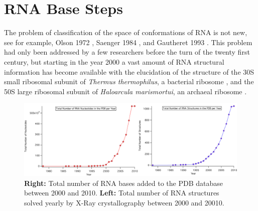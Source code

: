 \chapter{RNA Base Steps}
\label{basesteps} 

The problem of classification of the space of conformations
of RNA  is not  new, see for  example, Olson  1972 \cite{olson1_1972},
Saenger     1984     \cite{saenger1984},     and    Gautheret     1993
\cite{gautheret1993}.  This  problem had only been addressed  by a few
researchers before the turn of  the twenty first century, but starting
in  the year  2000 a  vast amount  of RNA  structural  information has
become  available with  the elucidation  of the  structure of  the 30S
small ribosomal subunit  of \textit{Thermus thermophilus}, a bacterial
ribosome \cite{wimberly2000, schluenzen2000}, and the 50S large
ribosomal subunit of \textit{Haloarcula marismortui}, an archaeal
ribosome \cite{ban2000}.
\begin{figure}[H]
\centering
\includegraphics[scale=0.4]{Chapter2/rna1978_2010.png}
\caption{\textbf{Right:} Total  number of RNA  bases added to  the PDB
database  between 2000 and  2010. \textbf{Left:}  Total number  of RNA
structures  solved yearly  by X-Ray  crystallography between  2000 and
20010.}
\label{fig:rnainpdb}
\end{figure}

